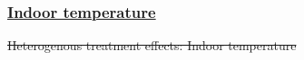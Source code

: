 \documentclass[
  letterpaper,
  DIV=11,
  numbers=noendperiod]{scrartcl}
\makeatletter
\renewenvironment{table}%
   {\renewcommand\familydefault\sfdefault
    \@float{table}}
   {\end@float}
\providecommand{\DIFadd}[1]{{\protect\color{blue}\underline{#1}}} %
\providecommand{\DIFdel}[1]{{\protect\color{red}\sout{#1}}}                      %
\providecommand{\DIFaddbegin}{} %
\providecommand{\DIFaddend}{} %
\providecommand{\DIFdelbegin}{} %
\providecommand{\DIFdelend}{} %
\providecommand{\DIFdelFL}[1]{\DIFdel{#1}} %
\newcommand{\DIFscaledelfig}{0.5}
\newlength{\DIFdelgraphicswidth} %
\newlength{\DIFdelgraphicsheight} %
\newcommand{\DIFaddincludegraphics}[2][]{{\color{blue}\fbox{\DIFOincludegraphics[#1]{#2}}}} %
\newcommand{\DIFdelincludegraphics}[2][]{%
\sbox{\DIFdelgraphicsbox}{\DIFOincludegraphics[#1]{#2}}%
\settoboxwidth{\DIFdelgraphicswidth}{\DIFdelgraphicsbox} %
\settoboxtotalheight{\DIFdelgraphicsheight}{\DIFdelgraphicsbox} %
\scalebox{\DIFscaledelfig}{%
\parbox[b]{\DIFdelgraphicswidth}{\usebox{\DIFdelgraphicsbox}\\[-\baselineskip] \rule{\DIFdelgraphicswidth}{0em}}\llap{\resizebox{\DIFdelgraphicswidth}{\DIFdelgraphicsheight}{%
\setlength{\unitlength}{\DIFdelgraphicswidth}%
\begin{picture}(1,1)%
\thicklines\linethickness{2pt} %
{\color[rgb]{1,0,0}\put(0,0){\framebox(1,1){}}}%
{\color[rgb]{1,0,0}\put(0,0){\line( 1,1){1}}}%
{\color[rgb]{1,0,0}\put(0,1){\line(1,-1){1}}}%
\end{picture}%
}\hspace*{3pt}}} %
} %
\DeclareRobustCommand{\DIFaddbegin}{\DIFOaddbegin \let\includegraphics\DIFaddincludegraphics} %
\DeclareRobustCommand{\DIFaddend}{\DIFOaddend \let\includegraphics\DIFOincludegraphics} %
\DeclareRobustCommand{\DIFdelbegin}{\DIFOdelbegin \let\includegraphics\DIFdelincludegraphics} %
\DeclareRobustCommand{\DIFdelend}{\DIFOaddend \let\includegraphics\DIFOincludegraphics} %
\makeatother
\begin{document}
\DIFdelend \newpage

\DIFdelbegin %
\DIFdelend \DIFaddbegin \subsubsection{\DIFadd{Indoor temperature}}\label{indoor-temperature}
\DIFaddend 

\DIFdelbegin %
{%
\DIFdelFL{Heterogenous treatment effects: Indoor temperature }}%

\end{document}
